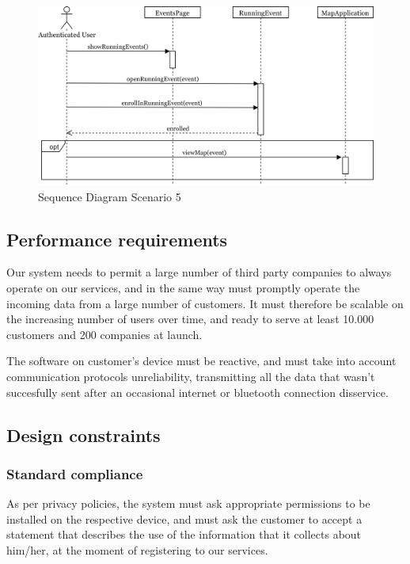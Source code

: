 \documentclass[../main.tex]{subfiles}
\begin{document}
		\begin{figure}[H]
			\centering
			\includegraphics[scale=.08]{images/sequenceDiagram5.png}
			\caption{Sequence Diagram Scenario 5 \label{fig:Sequence Diagram Scenario 5}}
		\end{figure}


\subsection{Performance requirements}

Our system needs to permit a large number of third party companies to always operate on our services, and in the same way must promptly operate the incoming data from a large number of customers. It must therefore be scalable on the increasing number of users over time, and ready to serve at least 10.000 customers and 200 companies at launch.

The software on customer's device must be reactive, and must take into account communication protocols unreliability, transmitting all the data that wasn't succesfully sent after an occasional internet or bluetooth connection disservice.

\subsection{Design constraints}

\subsubsection{Standard compliance}

As per privacy policies, the system must ask appropriate permissions to be installed on the respective device, and must ask the customer to accept a statement that describes the use of the information that it collects about him/her, at the moment of registering to our services.
\end{document}
